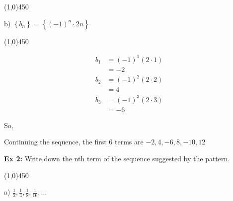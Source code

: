 \documentclass{report}
\begin{document}
\line(1,0){450}

\begin{center}
\begin{large}
{\LARGE{b)}} $\left\{b_n\right\}=\left\{(-1)^n \cdot 2 n\right\}$
\end{large}
\end{center}

\line(1,0){450}

\begin{align*} b_1 & =(-1)^1(2 \cdot 1) \\ & =-2 \\ b_2 & =(-1)^2(2 \cdot 2) \\ & =4 \\ b_3 & =(-1)^3(2 \cdot 3) \\ & = -6 \end{align*}

So,
\vspace{3mm}

Continuing the sequence, the first 6 terms are $-2,4,-6,8,-10,12$
\vspace{2mm}

\begin{center}


\end{center}
\bigbreak \noindent \bigbreak \noindent

\begin{center}
 \begin{large}
	 \textbf{Ex 2:} 
	 Write down the nth term of the sequence suggested by the pattern.
 \end{large} 
\end{center}
\bigbreak \noindent

\line(1,0){450}

\begin{center}
\begin{large}
	{\LARGE{a)}} $\frac{1}{2}, \frac{1}{4}, \frac{1}{8}, \frac{1}{16}, \ldots$
\end{large}
\end{center}
\end{document}
